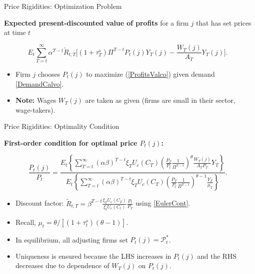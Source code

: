 \documentclass[11pt,aspectratio=169]{beamer}
\begin{document}
\begin{frame}[label=CalvoExpectedProfits]{Price Rigidities: Optimization Problem}
\small

\textbf{Expected present-discounted value of profits} for a firm $j$ that has set prices at time $t$

\begin{equation}
E_t \sum_{T=t}^{\infty} \alpha^{T-t} \tilde{R}_{t,T} 
\Big[ (1+\tau_T^s) \Pi^{T-t} P_t(j) Y_T(j) - \frac{W_T(j)}{A_T} Y_T(j) \Big].
\label{ProfitsValco}
\end{equation}

\begin{itemize}
  \item Firm $j$ chooses $P_t(j)$ to maximize (\ref{ProfitsValco}) given demand \eqref{DemandCalvo}.
  \item \textbf{Note:} Wages $W_T(j)$ are taken as given (firms are small in their sector, wage-takers).
\end{itemize}
\end{frame}

\begin{frame}[label=CalvoOptimalPrice]{Price Rigidities: Optimality Condition}
\small

\textbf{First-order condition for optimal price $P_t(j)$:}

\begin{equation}
\frac{P_t(j)}{P_t} = 
\frac{
E_t \left\{ \sum_{T=t}^{\infty} (\alpha \beta)^{T-t} \xi_T U_c(C_T) 
\left( \frac{P_T}{P_t} \frac{1}{\Pi^{T-t}} \right)^\theta 
\frac{W_T(j)}{A_T P_T} Y_T \right\}
}{
E_t \left\{ \sum_{T=t}^{\infty} (\alpha \beta)^{T-t} \xi_T U_c(C_T) 
\left( \frac{P_T}{P_t} \frac{1}{\Pi^{T-t}} \right)^{\theta-1} 
\frac{Y_T}{\mu_T} \right\}
}.
\label{ASn11}
\end{equation}

\begin{itemize}
  \item Discount factor: $\tilde{R}_{t,T} = \beta^{T-t} \frac{\xi_T U_c(C_T)}{\xi_t U_c(C_t)} \frac{P_t}{P_T}$ using \eqref{EulerCont}.
  \item Recall, $\mu_t = \theta / [(1+\tau_t^s)(\theta-1)]$.
  \item In equilibrium, all adjusting firms set $P_t(j) = \mathcal{P}_t^\ast$.
  \item Uniqueness is ensured because the LHS increases in $P_t(j)$ and the RHS decreases due to dependence of $W_T(j)$ on $P_t(j)$.
\end{itemize}

\end{frame}
\end{document}
